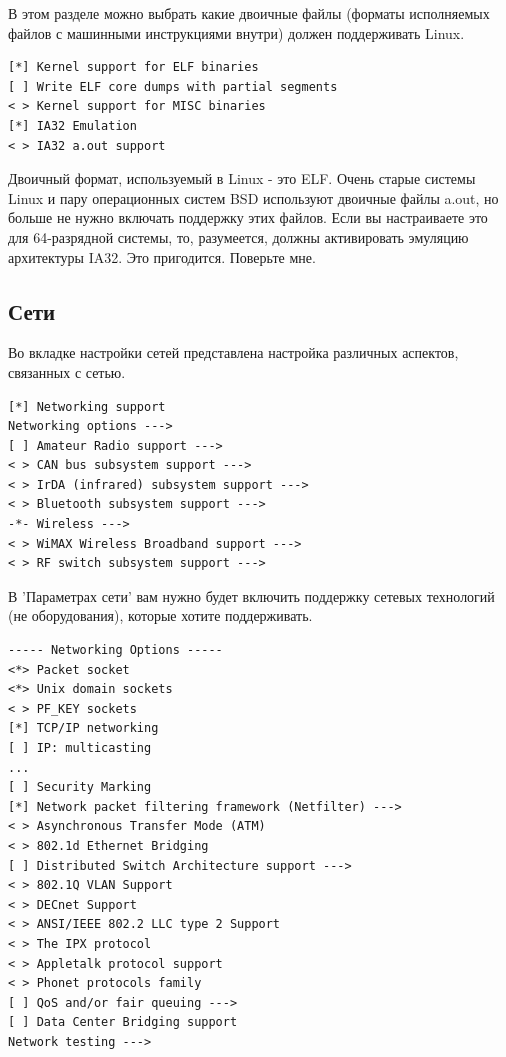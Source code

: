\documentclass[10pt]{book}
\begin{document}
В этом разделе можно выбрать какие двоичные файлы (форматы исполняемых файлов с машинными инструкциями внутри) должен поддерживать Linux.

\vspace{3mm}
\begin{tcolorbox}[colback=gray!14!white, colframe=blue!75!blue]
\begin{lstlisting}
[*] Kernel support for ELF binaries
[ ] Write ELF core dumps with partial segments
< > Kernel support for MISC binaries
[*] IA32 Emulation
< > IA32 a.out support
\end{lstlisting}
\end{tcolorbox}

Двоичный формат, используемый в Linux - это ELF. Очень старые системы Linux и пару операционных систем BSD используют двоичные файлы a.out, но больше не нужно включать поддержку этих файлов. Если вы настраиваете это для 64-разрядной системы, то, разумеется, должны активировать эмуляцию архитектуры IA32. Это пригодится. Поверьте мне.

\subsection{Сети}

Во вкладке настройки сетей представлена настройка различных аспектов, связанных с сетью.

\vspace{3mm}
\begin{tcolorbox}[colback=gray!14!white, colframe=blue!75!blue]
\begin{lstlisting}
[*] Networking support
Networking options --->
[ ] Amateur Radio support --->
< > CAN bus subsystem support --->
< > IrDA (infrared) subsystem support --->
< > Bluetooth subsystem support --->
-*- Wireless --->
< > WiMAX Wireless Broadband support --->
< > RF switch subsystem support --->
\end{lstlisting}
\end{tcolorbox}

В 'Параметрах сети' вам нужно будет включить поддержку сетевых технологий (не оборудования), которые хотите поддерживать.

\vspace{3mm}
\begin{tcolorbox}[colback=gray!14!white, colframe=blue!75!blue]
\begin{lstlisting}
----- Networking Options -----
<*> Packet socket
<*> Unix domain sockets
< > PF_KEY sockets
[*] TCP/IP networking
[ ] IP: multicasting
...
[ ] Security Marking
[*] Network packet filtering framework (Netfilter) --->
< > Asynchronous Transfer Mode (ATM)
< > 802.1d Ethernet Bridging
[ ] Distributed Switch Architecture support --->
< > 802.1Q VLAN Support
< > DECnet Support
< > ANSI/IEEE 802.2 LLC type 2 Support
< > The IPX protocol
< > Appletalk protocol support
< > Phonet protocols family
[ ] QoS and/or fair queuing --->
[ ] Data Center Bridging support
Network testing --->
\end{lstlisting}
\end{tcolorbox}
\end{document}
